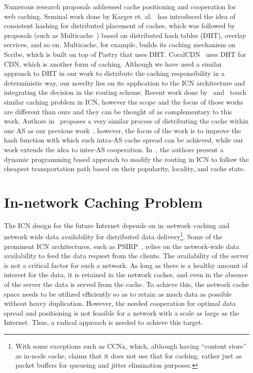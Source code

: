\documentclass[article]{elsarticle}
\begin{document}
Numerous research proposals addressed cache positioning and cooperation for web caching. Seminal work done by Karger et. al.~\cite{consistenthash} has introduced the idea of consistent hashing for distributed placement of caches, which was followed by proposals (such as Multicache~\cite{multicache}) based on distributed hash tables (DHT), overlay services, and so on. Multicache, for example, builds its caching mechanism on Scribe, which is built on top of Pastry that uses DHT. CoralCDN~\cite{coralcdn} uses DHT for CDN, which is another form of caching. Although we have used a similar approach to DHT in our work to distribute the caching responsibility in a deterministic way, our novelty lies on its application to the ICN architecture and integrating the decision in the routing scheme. Recent work done by~\cite{saino2013hash} and~\cite{sourlas2013cache} touch similar caching problem in ICN, however the scope and the focus of those works are different than ours and they can be thought of as complementary to this work. Authors in~\cite{saino2013hash} proposes a very similar process of distributing the cache within one AS as our previous work~\cite{myinfocom}, however, the focus of the work is to improve the hash function with which such intra-AS cache spread can be achieved, while our work extends the idea to inter-AS cooperation. In~\cite{sourlas2013cache}, the authors present a dynamic programming based approach to modify the routing in ICN to follow the cheapest transportation path based on their popularity, locality, and cache state. 

\section{In-network Caching Problem}
\label{sec:problem}
The ICN design for the future Internet depends on in--network--caching and network wide data availability for distributed data delivery\footnote{With some exceptions such as CCNx\cite{ccn}, which, although having ``content store'' as in-node cache, claims that it does not use that for caching, rather just as packet buffers for queueing and jitter elimination purposes.}. Some of the prominent ICN architectures, such as PSIRP~\cite{psirp}, relies on the network-wide data availability to feed the data request from the clients. The availability of the server is not a critical factor for such a network. As long as there is a healthy amount of interest for the data, it is retained in the network caches, and even in the absence of the server the data is served from the cache. To achieve this, the network cache space needs to be utilized efficiently so as to retain as much data as possible without heavy duplication. However, the needed cooperation for optimal data spread and positioning is not feasible for a network with a scale as large as the Internet. Thus, a radical approach is needed to achieve this target.
\end{document}
